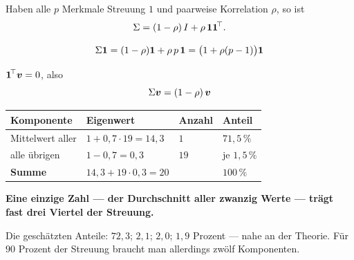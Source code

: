 \begin{merksatz}
Haben alle $p$ Merkmale Streuung $1$ und paarweise Korrelation $\rho$, so ist
\[ \Sigma = (1-\rho)\,I + \rho\,\boldsymbol{1}\boldsymbol{1}^{\!\top} . \]

\[ \Sigma\boldsymbol{1} = (1-\rho)\boldsymbol{1} + \rho\,p\,\boldsymbol{1} = \bigl(1 + \rho(p-1)\bigr)\boldsymbol{1} \]

 $\boldsymbol{1}^{\!\top}\boldsymbol{v} = 0$, also
\[ \Sigma\boldsymbol{v} = (1-\rho)\,\boldsymbol{v} \]

\begin{center}
{\small
\renewcommand{\arraystretch}{1.5}
\begin{tabular}{@{}P{2.4cm}P{2.4cm}P{2.0cm}P{1.6cm}@{}}
\toprule
\textbf{Komponente} & \textbf{Eigenwert} & \textbf{Anzahl} & \textbf{Anteil}\\
\midrule
Mittelwert aller & $1+0{,}7\cdot19 = 14{,}3$ & $1$ & $71{,}5\,\%$\\
alle übrigen & $1-0{,}7 = 0{,}3$ & $19$ & je $1{,}5\,\%$\\
\midrule
\textbf{Summe} & $14{,}3 + 19\cdot0{,}3 = 20$ & & $100\,\%$\\
\bottomrule
\end{tabular}}
\end{center}

\begin{center}
\begin{minipage}{0.9\textwidth}
\textbf{Eine einzige Zahl --- der Durchschnitt aller zwanzig Werte --- trägt fast drei Viertel der Streuung.}
\end{minipage}
\end{center}

\begin{center}
\begin{minipage}{0.88\textwidth}
\end{minipage}
\end{center}

Die geschätzten Anteile: $72{,}3$; $2{,}1$; $2{,}0$; $1{,}9$ Prozent --- nahe an der Theorie. Für $90$ Prozent der Streuung braucht man allerdings zwölf Komponenten.

\begin{center}
\begin{minipage}{0.88\textwidth}
\end{minipage}
\end{center}
\end{merksatz}

